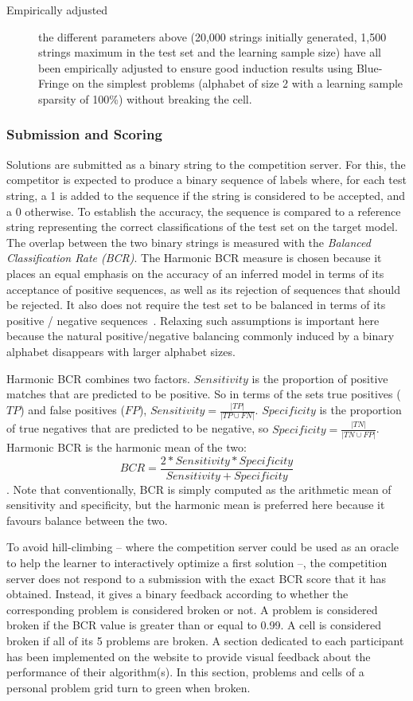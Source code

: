 \begin{description}
\item[Empirically adjusted] the different parameters above (20,000 strings initially generated, 1,500 strings maximum in the test set and the learning sample size) have all been empirically adjusted to ensure good induction results using Blue-Fringe on the simplest problems (alphabet of size 2 with a learning sample sparsity of 100\%) without breaking the cell.

\end{description}

\subsubsection*{Submission and Scoring}

Solutions are submitted as a binary string to the competition server. For this, the competitor is expected to produce a binary sequence of labels where, for each test string, a 1 is added to the sequence if the string is considered to be accepted, and a 0 otherwise. To establish the accuracy, the sequence is compared to a reference string representing the correct classifications of the test set on the target model. The overlap between the two binary strings is measured with the \emph{Balanced Classification Rate (BCR)}. The Harmonic BCR measure is chosen because it places an equal emphasis on the accuracy of an inferred model in terms of its acceptance of positive sequences, as well as its rejection of sequences that should be rejected. It also does not require the test set to be balanced in terms of its positive / negative sequences~\cite{Walkinshaw2008}. Relaxing such assumptions is important here because the natural positive/negative balancing commonly induced by a binary alphabet disappears with larger alphabet sizes.

Harmonic BCR combines two factors. $Sensitivity$ is the proportion of positive matches that are predicted to be positive. So in terms of the sets true positives ($TP$) and false positives ($FP$), $Sensitivity=\frac{|TP|}{|TP \cup FN|}$. $Specificity$ is the proportion of true negatives that are predicted to be negative, so $Specificity=\frac{|TN|}{|TN \cup FP|}$. Harmonic BCR is the harmonic mean of the two: $$BCR=\frac{2*Sensitivity*Specificity}{Sensitivity + Specificity}$$. Note that conventionally, BCR is simply computed as the arithmetic mean of sensitivity and specificity, but the harmonic mean is preferred here because it favours balance between the two.

To avoid hill-climbing -- where the competition server could be used as an oracle to help the learner to interactively optimize a first solution --, the competition server does not respond to a submission with the exact BCR score that it has obtained. Instead, it gives a binary feedback according to whether the corresponding problem is considered broken or not. A problem is considered broken if the BCR value is greater than or equal to 0.99. A cell is considered broken if all of its 5 problems are broken. A section dedicated to each participant has been implemented on the website to provide visual feedback about the performance of their algorithm(s). In this section, problems and cells of a personal problem grid turn to green when broken.

